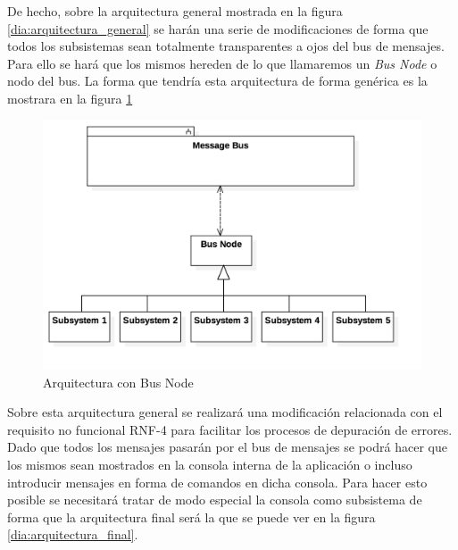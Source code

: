 \bigskip

De hecho, sobre la arquitectura general mostrada en la figura \ref{dia:arquitectura_general} se harán una serie de modificaciones de forma que todos los subsistemas sean totalmente transparentes a ojos del bus de mensajes. Para ello se hará que los mismos hereden de lo que llamaremos un \textit{Bus Node} o nodo del bus. La forma que tendría esta arquitectura de forma genérica es la mostrara en la figura \ref{dia:actual_arquitecture}

\bigskip

\begin{figure}
	\includegraphics[width=15cm]{otros/UML/png/actual_arquitecture.png}
	\caption{Arquitectura con Bus Node}
	\label{dia:actual_arquitecture}
\end{figure}

\bigskip

Sobre esta arquitectura general se realizará una modificación relacionada con el requisito no funcional RNF-4 para facilitar los procesos de depuración de errores. Dado que todos los mensajes pasarán por el bus de mensajes se podrá hacer que los mismos sean mostrados en la consola interna de la aplicación o incluso introducir mensajes en forma de comandos en dicha consola. Para hacer esto posible se necesitará tratar de modo especial la consola como subsistema de forma que la arquitectura final será la que se puede ver en la figura \ref{dia:arquitectura_final}.

\bigskip


